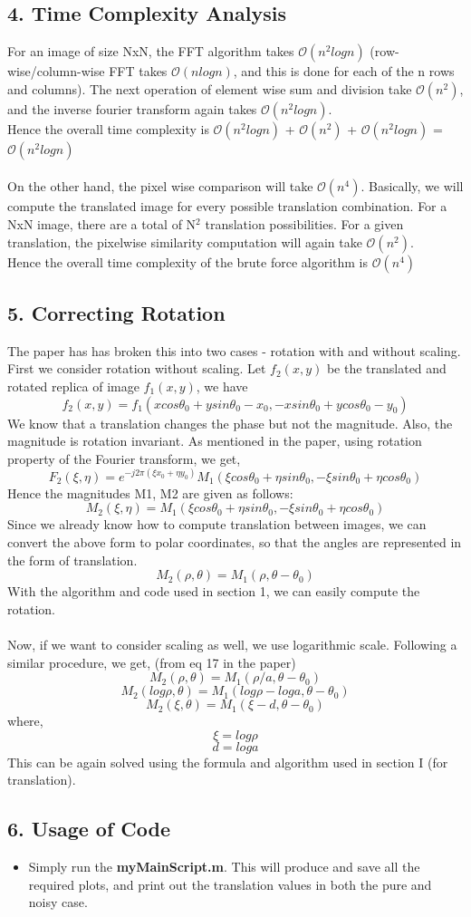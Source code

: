 \documentclass[12pt, a4paper]{article}
\begin{document}
\subsection*{4. Time Complexity Analysis}
For an image of size NxN, the FFT algorithm takes $\mathcal{O}(n^2logn)$ (row-wise/column-wise FFT takes $\mathcal{O}(nlogn)$, and this is done for each of the n rows and columns). The next operation of element wise sum and division take $\mathcal{O}(n^2)$, and the inverse fourier transform again takes $\mathcal{O}(n^2logn)$. \\
Hence the overall time complexity is $\mathcal{O}(n^2logn)$ + $\mathcal{O}(n^2)$ + $\mathcal{O}(n^2logn)$ = $\mathcal{O}(n^2logn)$ \\ \\ 
On the other hand, the pixel wise comparison will take $\mathcal{O}(n^4)$. Basically, we will compute the translated image for every possible translation combination. For a NxN image, there are a total of N$^2$ translation possibilities. For a given translation, the pixelwise similarity computation will again take $\mathcal{O}(n^2)$. \\ Hence the overall time complexity of the brute force algorithm is $\mathcal{O}(n^4)$
\subsection*{5. Correcting Rotation}
The paper has has broken this into two cases - rotation with and without scaling. \\
First we consider rotation without scaling. Let $f_2(x,y)$ be the translated and rotated replica of image $f_1(x,y)$, we have
$$f_2(x,y) = f_1(xcos\theta_0 + ysin\theta_0 - x_0, -xsin\theta_0 + ycos\theta_0 - y_0)$$
We know that a translation changes the phase but not the magnitude. Also, the magnitude is rotation invariant. As mentioned in the paper, using rotation property of the Fourier transform, we get,
$$F_2(\xi ,\eta) = e^{-j2\pi(\xi x_0 + \eta y_0)} M_1(\xi cos\theta_0 + \eta sin\theta_0, -\xi sin\theta_0 + \eta cos\theta_0)$$
Hence the magnitudes M1, M2 are given as follows:
$$M_2(\xi ,\eta) = M_1(\xi cos\theta_0 + \eta sin\theta_0, -\xi sin\theta_0 + \eta cos\theta_0)$$
Since we already know how to compute translation between images, we can convert the above form to polar coordinates, so that the angles are represented in the form of translation.
$$M_2(\rho ,\theta) = M_1(\rho ,\theta-\theta_0)$$
With the algorithm and code used in section 1, we can easily compute the rotation. \\ \\ 
Now, if we want to consider scaling as well, we use logarithmic scale. Following a similar procedure, we get, (from eq 17 in the paper)
$$M_2(\rho ,\theta) = M_1(\rho/a ,\theta-\theta_0)$$
$$M_2(log\rho ,\theta) = M_1(log\rho - loga ,\theta-\theta_0)$$
$$M_2(\xi ,\theta) = M_1(\xi - d ,\theta-\theta_0)$$
where,
$$\xi = log\rho$$
$$d = loga$$
This can be again solved using the formula and algorithm used in section I (for translation).
\subsection*{6. Usage of Code}
\begin{itemize}
\item Simply run the \textbf{myMainScript.m}. This will produce and save all the required plots, and print out the translation values in both the pure and noisy case.
\end{itemize}
\end{document}

